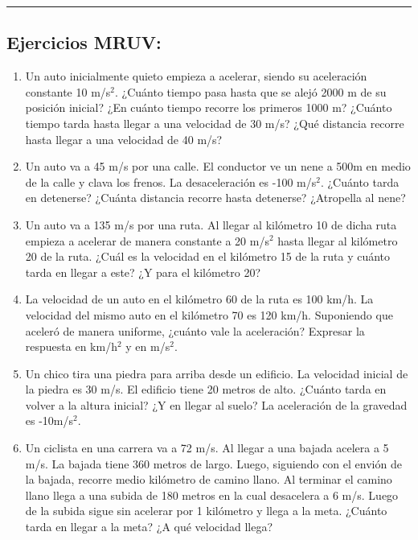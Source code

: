 \hrule

\subsection*{Ejercicios MRUV:}

\begin{enumerate}
    \item Un auto inicialmente quieto empieza a acelerar, siendo su aceleración constante 10 m/s$^2$. ¿Cuánto tiempo pasa hasta que se alejó 2000 m de su posición inicial? ¿En cuánto tiempo recorre los primeros 1000 m? ¿Cuánto tiempo tarda hasta llegar a una velocidad de 30 m/s? ¿Qué distancia recorre hasta llegar a una velocidad de 40 m/s?
    
    \item Un auto va a 45 m/s por una calle. El conductor ve un nene a 500m en medio de la calle y clava los frenos. La desaceleración es -100 m/s$^2$. ¿Cuánto tarda en detenerse? ¿Cuánta distancia recorre hasta detenerse? ¿Atropella al nene? 
    
    \item Un auto va a 135 m/s por una ruta. Al llegar al kilómetro 10 de dicha ruta empieza a acelerar de manera constante a 20 m/s$^2$ hasta llegar al kilómetro 20 de la ruta. ¿Cuál es la velocidad en el kilómetro 15 de la ruta y cuánto tarda en llegar a este? ¿Y para el kilómetro 20? 
    
    \item La velocidad de un auto en el kilómetro 60 de la ruta es 100 km/h. La velocidad del mismo auto en el kilómetro 70 es 120 km/h. Suponiendo que aceleró de manera uniforme, ¿cuánto vale la aceleración? Expresar la respuesta en km/h$^2$ y en m/s$^2$. %
    
    \item Un chico tira una piedra para arriba desde un edificio. La velocidad inicial de la piedra es 30 m/s. El edificio tiene 20 metros de alto. ¿Cuánto tarda en volver a la altura inicial? ¿Y en llegar al suelo? La aceleración de la gravedad es -10m/s$^2$. %
    
    \item Un ciclista en una carrera va a 72 m/s. Al llegar a una bajada acelera a 5 m/s. La bajada tiene 360 metros de largo. Luego, siguiendo con el envión de la bajada, recorre medio kilómetro de camino llano. Al terminar el camino llano llega a una subida de 180 metros en la cual desacelera a 6 m/s. Luego de la subida sigue sin acelerar por 1 kilómetro y llega a la meta. ¿Cuánto tarda en llegar a la meta? ¿A qué velocidad llega?


\end{enumerate}
